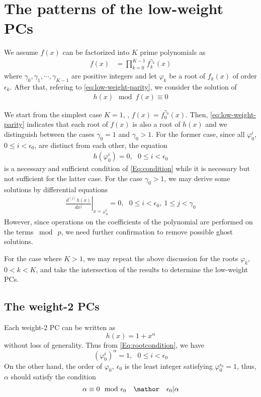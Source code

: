 \section{The patterns of the low-weight PCs}
\label{sec3}
We assume $f(x)$ can be factorized into $K$ prime polynomials as 
\begin{align}
f(x)&=\prod_{k=0}^{K-1}f_k^{\gamma_k}(x)
\end{align}
where $\gamma_0,\gamma_1,\cdots,\gamma_{K-1}$ are positive integers and let $\varphi_k$ be a root of $f_{k}(x)$ of order $\epsilon_k$. After that, refering to \eqref{eq:low-weight-parity}, we consider the solution of
\begin{align}
	h(x) \mod f(x) \equiv 0
	\label{Eq:condition}
\end{align}

We start from the simplest case $K=1$, \ie, $f(x) = f_0^{\gamma_0}(x)$. Then, \eqref{eq:low-weight-parity} indicates that each root of $f(x)$ is also a root of $h(x)$ and we distinguish between the cases $\gamma_0 = 1$ and $\gamma_0 > 1$. For the former case, since all $\varphi_0^i$, $0 \leq i < \epsilon_0$, are distinct from each other, the equation
\begin{align}
	h(\varphi_0^i)=0,~~~ 0 \leq i < \epsilon_0
	\label{Eq:rootcondition}
\end{align}
is a necessary and sufficient condition of \eqref{Eq:condition} while it is necessary but not sufficient for the latter case. For the case $\gamma_0 >1$, we may derive some solutions by differential equations
\begin{align}
\left.\frac{d^{(j)}h(x)}{d x^j}\right|_{x=\varphi_0^i}=0,~~~0 \leq i < \epsilon_0,~1 \leq j < \gamma_0
\label{Eq:differential}
\end{align}
However, since operations on the coefficients of the polynomial are performed on the terms $\bmod~ p$, we need further confirmation to remove possible ghost solutions.

For the case where $K>1$, we may repeat the above discussion for the roots $\varphi_k$, $0 < k < K$, and take the intersection of the results to determine the low-weight PCs.

\subsection{The weight-2 PCs}
\label{sec:PC2}
Each weight-2 PC can be written as 
\begin{equation}
h(x)=1+x^{\alpha}
\label{eq:wt2-gen-form}
\end{equation}
without loss of generality. Thus from \eqref{Eq:rootcondition}, we have 
\begin{equation}
(\varphi_0^i)^{\alpha} =1,~~~ 0 \leq i < \epsilon_0
\label{novelEq5b}
\end{equation}
On the other hand, the order of $\varphi_0,~\epsilon_0$ is the least integer satisfying $\varphi_0^{\epsilon_0} = 1$, thus, $\alpha$ should satisfy the condition
\begin{equation}
\alpha \equiv 0 \mod \epsilon_0~~~\mathor~~~\epsilon_0|\alpha
\label{eq:wt2-alpha}
\end{equation}

